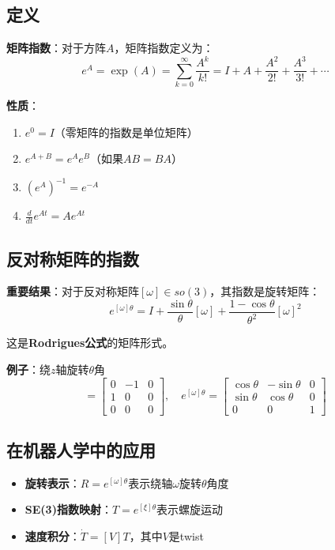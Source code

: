 \documentclass[12pt,a4paper]{article}
\begin{document}
\subsection{定义}

\textbf{矩阵指数}：对于方阵$A$，矩阵指数定义为：
\begin{equation}
e^A = \exp(A) = \sum_{k=0}^\infty \frac{A^k}{k!} = I + A + \frac{A^2}{2!} + \frac{A^3}{3!} + \cdots
\end{equation}

\textbf{性质}：
\begin{enumerate}
\item $e^0 = I$（零矩阵的指数是单位矩阵）
\item $e^{A+B} = e^A e^B$（如果$AB = BA$）
\item $(e^A)^{-1} = e^{-A}$
\item $\frac{d}{dt}e^{At} = A e^{At}$
\end{enumerate}

\subsection{反对称矩阵的指数}

\textbf{重要结果}：对于反对称矩阵$[\omega] \in so(3)$，其指数是旋转矩阵：
\begin{equation}
e^{[\omega]\theta} = I + \frac{\sin\theta}{\theta}[\omega] + \frac{1-\cos\theta}{\theta^2}[\omega]^2
\end{equation}

这是\textbf{Rodrigues公式}的矩阵形式。

\textbf{例子}：绕$z$轴旋转$\theta$角
\begin{equation}
[\omega] = \begin{bmatrix} 0 & -1 & 0 \\ 1 & 0 & 0 \\ 0 & 0 & 0 \end{bmatrix}, \quad
e^{[\omega]\theta} = \begin{bmatrix} \cos\theta & -\sin\theta & 0 \\ \sin\theta & \cos\theta & 0 \\ 0 & 0 & 1 \end{bmatrix}
\end{equation}

\subsection{在机器人学中的应用}

\begin{itemize}
\item \textbf{旋转表示}：$R = e^{[\omega]\theta}$表示绕轴$\omega$旋转$\theta$角度
\item \textbf{SE(3)指数映射}：$T = e^{[\xi]\theta}$表示螺旋运动
\item \textbf{速度积分}：$\dot{T} = [V] T$，其中$V$是twist
\end{itemize}
\end{document}
